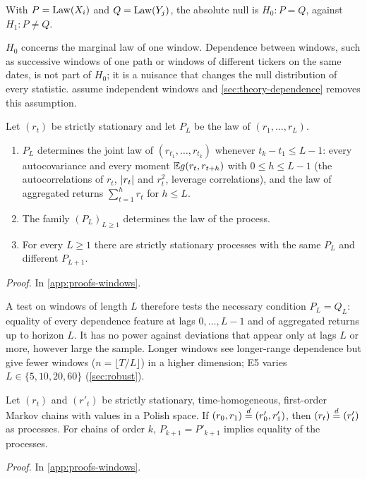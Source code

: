 \begin{definition}\label{def:abs-null}
With $P=\operatorname{Law}(X_i)$ and $Q=\operatorname{Law}(Y_j)$, the absolute null is $H_0:P=Q$, against $H_1:P\neq Q$.
\end{definition}

$H_0$ concerns the marginal law of one window. Dependence between windows, such as successive
windows of one path or windows of different tickers on the same dates, is not part of $H_0$; it is
a nuisance that changes the null distribution of every statistic.
 assume
independent windows and \cref{sec:theory-dependence} removes this assumption.

\begin{proposition}\label{prop:window-ident}
Let $(r_t)$ be strictly stationary and let $P_L$ be the law of $(r_1,\dots,r_L)$.
\begin{enumerate}
  \item[(a)] $P_L$ determines the joint law of $(r_{t_1},\dots,r_{t_k})$ whenever
  $t_k-t_1\le L-1$: every autocovariance and every moment $\mathbb{E} g(r_t,r_{t+h})$ with
  $0\le h\le L-1$ (the autocorrelations of $r_t$, $\lvert r_t\rvert$ and $r_t^2$, leverage correlations),
  and the law of aggregated returns $\sum_{t=1}^h r_t$ for $h\le L$.
  \item[(b)] The family $(P_L)_{L\ge1}$ determines the law of the process.
  \item[(c)] For every $L\ge1$ there are strictly stationary processes with the same $P_L$ and
  different $P_{L+1}$.
\end{enumerate}
\end{proposition}
\noindent\textit{Proof.} In \cref{app:proofs-windows}.

A test on windows of length $L$ therefore tests the necessary condition $P_L=Q_L$: equality of
every dependence feature at lags $0,\dots,L-1$ and of aggregated returns up to horizon $L$. It has
no power against deviations that appear only at lags $L$ or more, however large the sample.
Longer windows see longer-range dependence but give fewer windows ($n=\lfloor T/L\rfloor$) in a
higher dimension; E5 varies $L\in\{5,10,20,60\}$ (\cref{sec:robust}).

\begin{proposition}\label{prop:markov-pairs}
Let $(r_t)$ and $(r'_t)$ be strictly stationary, time-homogeneous, first-order Markov chains with
values in a Polish space. If $(r_0,r_1)\overset{d}{=}(r'_0,r'_1)$, then $(r_t)\overset{d}{=}(r'_t)$ as processes. For
chains of order $k$, $P_{k+1}=P'_{k+1}$ implies equality of the processes.
\end{proposition}
\noindent\textit{Proof.} In \cref{app:proofs-windows}.

